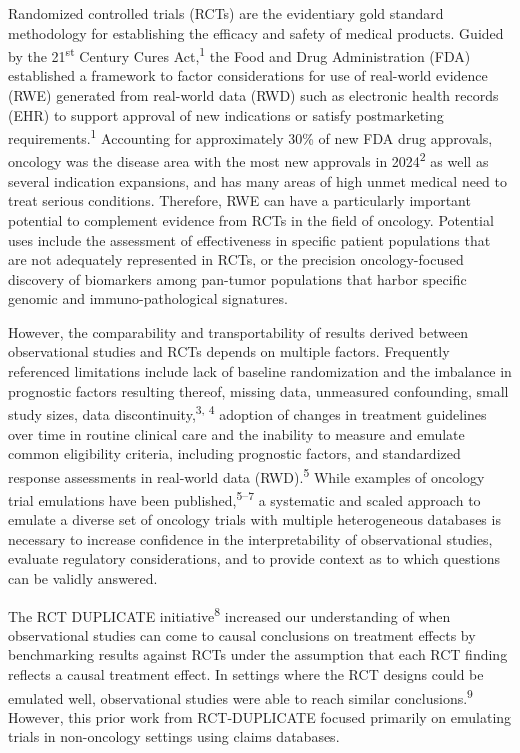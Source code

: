 \documentclass[
  letterpaper,
  DIV=11,
  numbers=noendperiod]{scrartcl}
\begin{document}
Randomized controlled trials (RCTs) are the evidentiary gold standard
methodology for establishing the efficacy and safety of medical
products. Guided by the 21\textsuperscript{st} Century Cures
Act,\textsuperscript{1} the Food and Drug Administration (FDA)
established a framework to factor considerations for use of real-world
evidence (RWE) generated from real-world data (RWD) such as electronic
health records (EHR) to support approval of new indications or satisfy
postmarketing requirements.\textsuperscript{1} Accounting for
approximately 30\% of new FDA drug approvals, oncology was the disease
area with the most new approvals in 2024\textsuperscript{2} as well as
several indication expansions, and has many areas of high unmet medical
need to treat serious conditions. Therefore, RWE can have a particularly
important potential to complement evidence from RCTs in the field of
oncology. Potential uses include the assessment of effectiveness in
specific patient populations that are not adequately represented in
RCTs, or the precision oncology-focused discovery of biomarkers among
pan-tumor populations that harbor specific genomic and
immuno-pathological signatures.

However, the comparability and transportability of results derived
between observational studies and RCTs depends on multiple factors.
Frequently referenced limitations include lack of baseline randomization
and the imbalance in prognostic factors resulting thereof, missing data,
unmeasured confounding, small study sizes, data
discontinuity,\textsuperscript{3, 4} adoption of changes in treatment
guidelines over time in routine clinical care and the inability to
measure and emulate common eligibility criteria, including prognostic
factors, and standardized response assessments in real-world data
(RWD).\textsuperscript{5} While examples of oncology trial emulations
have been published,\textsuperscript{5--7} a systematic and scaled
approach to emulate a diverse set of oncology trials with multiple
heterogeneous databases is necessary to increase confidence in the
interpretability of observational studies, evaluate regulatory
considerations, and to provide context as to which questions can be
validly answered.

The RCT DUPLICATE initiative\textsuperscript{8} increased our
understanding of when observational studies can come to causal
conclusions on treatment effects by benchmarking results against RCTs
under the assumption that each RCT finding reflects a causal treatment
effect. In settings where the RCT designs could be emulated well,
observational studies were able to reach similar
conclusions.\textsuperscript{9} However, this prior work from
RCT-DUPLICATE focused primarily on emulating trials in non-oncology
settings using claims databases.
\end{document}
